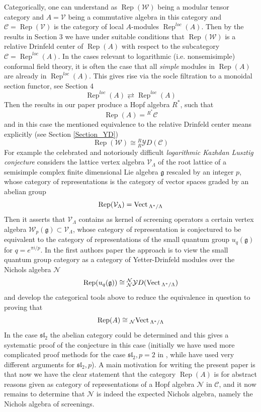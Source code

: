 \documentclass[11pt]{amsart}
\newcommand{\vc}{{\mathcal C}}
\newcommand{\YD}{{\mathcal YD}}
\newcommand{\Vect}{\mbox{\rm Vect\,}}
\newcommand\Rep{\operatorname{Rep}}
\renewcommand{\_}[1]{\mbox{$_{\left( #1 \right)}$}}
\theoremstyle{plain}
\numberwithin{equation}{section}
\theoremstyle{definition}
\theoremstyle{remark}
\theoremstyle{introTheorems}
\begin{document}
Categorically, one can understand as $\Rep(\mathcal{W})$ being a modular tensor category and $A=\mathcal{V}$ being a commutative  algebra in this category and $\vc=\Rep(\mathcal{V})$ is the category of local $A$-modules $\Rep^{loc}(A)$. Then by the results in \cite{CLR} Section $3$ we have under suitable conditions that $\Rep(\mathcal{W})$ is a relative Drinfeld center of $\Rep(A)$ with respect to the subcategory $\vc=\Rep^{loc}(A)$. In the cases relevant to logarithmic (i.e. nonsemisimple) conformal field theory, it is often the case that all \emph{simple} modules in $\Rep(A)$ are already in $\Rep^{loc}(A)$. This gives rise via the socle filtration to a monoidal section functor, see \cite{CLR} Section 4 $$\Rep^{loc}(A)\rightleftarrows \Rep^{loc}(A)$$
Then the results in our paper produce a Hopf algebra $R^*$, such that 
$$\Rep(A)={^{R^{*}}}\vc$$
and in this case the mentioned equivalence to the relative Drinfeld center means explicitly (see Section \ref{Section_YD})
$$\Rep(\mathcal{W})
\cong {^R_R}\YD(\vc)$$
For example the celebrated and notoriously difficult \emph{logarithmic Kazhdan Lusztig conjecture} considers the lattice vertex algebra $\mathcal{V}_\Lambda$ of the root lattice of a semisimple complex finite dimensional Lie algebra $\mathfrak{g}$ rescaled by an integer $p$, whose category of representations is the category of vector spaces graded by an abelian group 
$$\Rep(\mathcal{V}_\Lambda)=\Vect_{\Lambda^*/\Lambda}$$  Then it asserts that $\mathcal{V}_\Lambda$ contains as kernel of screening operators a certain vertex algebra $\mathcal{W}_p(\mathfrak{g})\subset \mathcal{V}_\Lambda$, whose category of representation is conjectured to be equivalent to the category of representations of the small quantum group $u_q(\mathfrak{g})$ for $q=e^{\pi i / p}$. In the first authors paper \cite{CLR} the approach is to view the small quantum group category as a category of Yetter-Drinfeld modules over the Nichols algebra $\mathcal{N}$
$$\Rep(u_q(\mathfrak{g}))\cong {^\mathcal{N}_\mathcal{N}}\YD(\Vect_{\Lambda^*/\Lambda})$$
and develop the categorical tools above to reduce the equivalence in question to proving that 
$$\Rep(A)\cong {_\mathcal{N}}\Vect_{\Lambda^*/\Lambda}$$
In the case $\mathfrak{sl}_2$ the abelian category could be determined and this gives a systematic proof of the conjecture in this case (initially we have used more complicated proof methods for the case $\mathfrak{sl}_2,p=2$ in \cite{CLR}, while \cite{GN} have used very different arguments for $\mathfrak{sl}_2,p$). A main motivation for writing the present paper is that now we have the clear statement that the category $\Rep(A)$ is for abstract reasons given as category of representations of a Hopf algebra $\mathcal{N}$ in $\vc$, and it now remains to determine that $\mathcal{N}$ is indeed the expected Nichols algebra, namely the Nichols algebra of screenings. 
\end{document}
